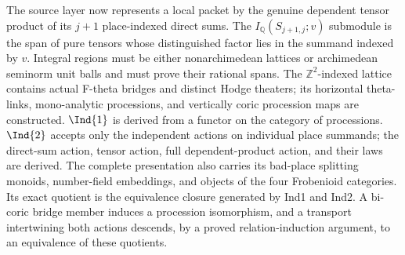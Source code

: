 \begin{definition}
  \leanok
  The source layer now represents a local packet by the genuine dependent
  tensor product of its \(j+1\) place-indexed direct sums.  The
  \(I_{\mathbb Q}(S_{j+1,j};v)\) submodule is the span of pure tensors whose
  distinguished factor lies in the summand indexed by \(v\).  Integral
  regions must be either nonarchimedean lattices or archimedean seminorm unit
  balls and must prove their rational spans.  The \(\mathbb Z^2\)-indexed
  lattice contains actual F-theta bridges and distinct Hodge theaters; its
  horizontal theta-links, mono-analytic processions, and vertically coric
  procession maps are constructed.  \(\Ind{1}\) is derived from a functor on
  the category of processions.  \(\Ind{2}\) accepts only the independent
  actions on individual place summands; the direct-sum action, tensor action,
  full dependent-product action, and their laws are derived.  The complete
  presentation also carries its bad-place splitting monoids, number-field
  embeddings, and objects of the four Frobenioid categories.  Its exact
  quotient is the equivalence closure generated by Ind1 and Ind2.  A bi-coric
  bridge member induces a procession isomorphism, and a transport intertwining
  both actions descends, by a proved relation-induction argument, to an
  equivalence of these quotients.


\end{definition}
